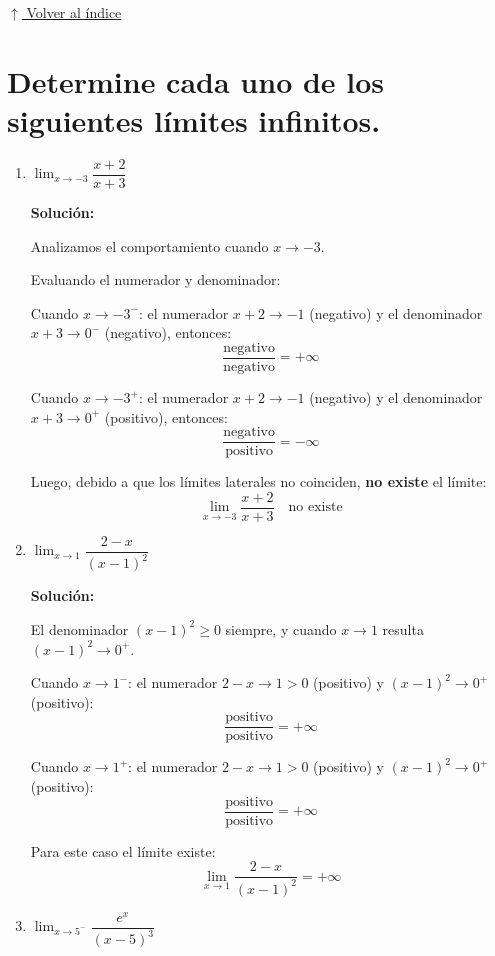 \documentclass[12pt]{article}
\newcommand{\solucion}{%
    \vspace{0.8em}%
    \textbf{Solución:}%
}
\newcommand{\volverindice}{%
    \vspace{1em}%
    \begin{flushright}%
        \hyperlink{indice}{\small $\uparrow$ Volver al índice}%
    \end{flushright}%
}
\begin{document}
\volverindice
\newpage

\section[Límites infinitos]{Determine cada uno de los siguientes límites infinitos.}

\begin{enumerate}[label=\alph*)]
    \item $\lim_{x \to -3} \dfrac{x + 2}{x + 3}$

    \solucion

    Analizamos el comportamiento cuando $x \to -3$.
    
    Evaluando el numerador y denominador:

    Cuando $x \to -3^-$: el numerador $x+2 \to -1$ (negativo) y el denominador $x+3 \to 0^-$ (negativo), entonces:
    \[
        \frac{\text{negativo}}{\text{negativo}} = +\infty
    \]

    Cuando $x \to -3^+$: el numerador $x+2 \to -1$ (negativo) y el denominador $x+3 \to 0^+$ (positivo), entonces:
    \[
        \frac{\text{negativo}}{\text{positivo}} = -\infty
    \]

    Luego, debido a que los límites laterales no coinciden, \textbf{no existe} el límite:
    \[
        \lim_{x\to-3}\frac{x+2}{x+3} \quad \text{no existe}
    \]

    \item $\lim_{x \to 1} \dfrac{2 - x}{(x - 1)^2}$

    \solucion

    El denominador $(x-1)^2 \geq 0$ siempre, y cuando $x \to 1$ resulta $(x-1)^2 \to 0^+$.

    Cuando $x \to 1^-$: el numerador $2-x \to 1 > 0$ (positivo) y $(x-1)^2 \to 0^+$ (positivo):
    \[
        \frac{\text{positivo}}{\text{positivo}} = +\infty
    \]

    Cuando $x \to 1^+$: el numerador $2-x \to 1 > 0$ (positivo) y $(x-1)^2 \to 0^+$ (positivo):
    \[
        \frac{\text{positivo}}{\text{positivo}} = +\infty
    \]

    Para este caso el límite existe:
    \[
        \lim_{x\to1}\frac{2-x}{(x-1)^2} = +\infty
    \]

    \newpage
    \item $\lim_{x \to 5^-} \dfrac{e^x}{(x - 5)^3}$


\end{enumerate}
\end{document}
